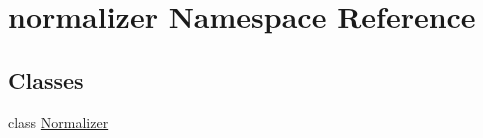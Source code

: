 \hypertarget{namespacenormalizer}{}\section{normalizer Namespace Reference}
\label{namespacenormalizer}
\subsection*{Classes}
\begin{DoxyCompactItemize}
\item 
class \hyperlink{classnormalizer_1_1Normalizer}{Normalizer}
\end{DoxyCompactItemize}
